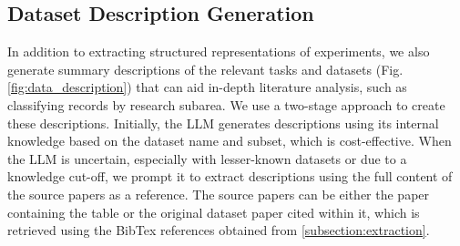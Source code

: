 \subsection{Dataset Description Generation}
\label{subsection:generation}

In addition to extracting structured representations of experiments, we also generate summary descriptions of the relevant tasks and datasets (Fig. \ref{fig:data_description}) that can aid in-depth literature analysis, such as classifying records by research subarea. 
We use a two-stage approach to create these descriptions. 
Initially, the LLM generates descriptions using its internal knowledge based on the dataset name and subset, which is cost-effective.
When the LLM is uncertain, especially with lesser-known datasets or due to a knowledge cut-off, we prompt it to extract descriptions using the full content of the source papers as a reference.
The source papers can be either the paper containing the table or the original dataset paper cited within it, which is retrieved using the BibTex references obtained from \cref{subsection:extraction}.
     
